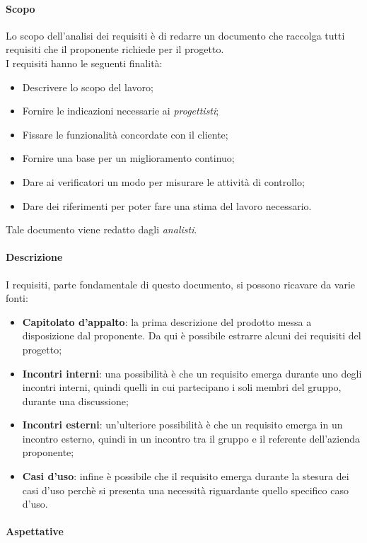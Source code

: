 \documentclass[../norme_di_progetto.tex]{subfiles}
\begin{document}
\paragraph{Scopo}
Lo scopo dell'analisi dei requisiti è di redarre un documento che raccolga tutti requisiti che il proponente richiede per il progetto.\\
I requisiti hanno le seguenti finalità:
\begin{itemize}
    \item Descrivere lo scopo del lavoro;
    \item Fornire le indicazioni necessarie ai \emph{progettisti};
    \item Fissare le funzionalità concordate con il cliente;
    \item Fornire una base per un miglioramento continuo;
    \item Dare ai verificatori un modo per misurare le attività di controllo;
    \item Dare dei riferimenti per poter fare una stima del lavoro necessario.
\end{itemize}
Tale documento viene redatto dagli \emph{analisti}.

\paragraph{Descrizione}
I requisiti, parte fondamentale di questo documento, si possono ricavare da varie fonti:
\begin{itemize}
    \item \textbf{Capitolato d'appalto}: la prima descrizione del prodotto messa a disposizione dal proponente. Da qui è possibile estrarre alcuni dei requisiti del progetto;
    \item \textbf{Incontri interni}: una possibilità è che un requisito emerga durante uno degli incontri interni, quindi quelli in cui partecipano i soli membri del gruppo, durante una discussione;
    \item \textbf{Incontri esterni}: un'ulteriore possibilità è che un requisito emerga in un incontro esterno, quindi in un incontro tra il gruppo e il referente dell'azienda proponente;
    \item \textbf{Casi d'uso}: infine è possibile che il requisito emerga durante la stesura dei casi d'uso perchè si presenta una necessità riguardante quello specifico caso d'uso.
\end{itemize}

\paragraph{Aspettative}
\end{document}
